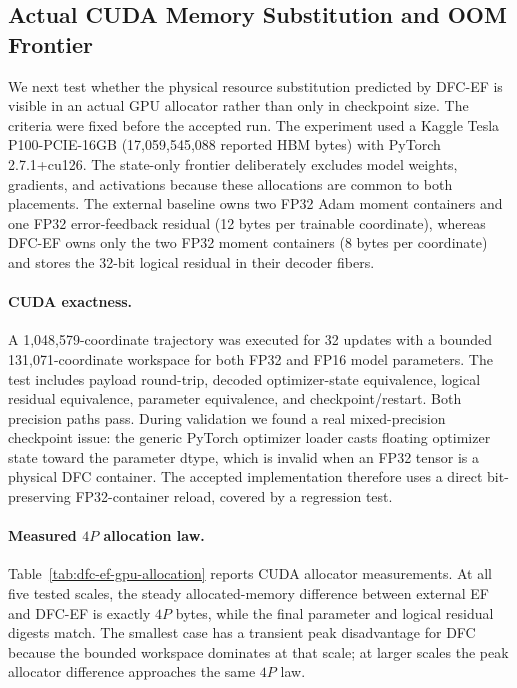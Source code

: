 
\subsection{Actual CUDA Memory Substitution and OOM Frontier}
\label{sec:dfc-ef-gpu}

We next test whether the physical resource substitution predicted by DFC-EF is
visible in an actual GPU allocator rather than only in checkpoint size.  The
criteria were fixed before the accepted run.  The experiment used a Kaggle
Tesla P100-PCIE-16GB (17,059,545,088 reported HBM bytes) with PyTorch
2.7.1+cu126.  The state-only frontier deliberately excludes model weights,
gradients, and activations because these allocations are common to both
placements.  The external baseline owns two FP32 Adam moment containers and one
FP32 error-feedback residual (12 bytes per trainable coordinate), whereas
DFC-EF owns only the two FP32 moment containers (8 bytes per coordinate) and
stores the 32-bit logical residual in their decoder fibers.

\paragraph{CUDA exactness.}
A 1,048,579-coordinate trajectory was executed for 32 updates with a bounded
131,071-coordinate workspace for both FP32 and FP16 model parameters.  The test
includes payload round-trip, decoded optimizer-state equivalence, logical
residual equivalence, parameter equivalence, and checkpoint/restart.  Both
precision paths pass.  During validation we found a real mixed-precision
checkpoint issue: the generic PyTorch optimizer loader casts floating optimizer
state toward the parameter dtype, which is invalid when an FP32 tensor is a
physical DFC container.  The accepted implementation therefore uses a direct
bit-preserving FP32-container reload, covered by a regression test.

\paragraph{Measured $4P$ allocation law.}
Table~\ref{tab:dfc-ef-gpu-allocation} reports CUDA allocator measurements.  At
all five tested scales, the steady allocated-memory difference between external
EF and DFC-EF is exactly $4P$ bytes, while the final parameter and logical
residual digests match.  The smallest case has a transient peak disadvantage
for DFC because the bounded workspace dominates at that scale; at larger scales
the peak allocator difference approaches the same $4P$ law.

